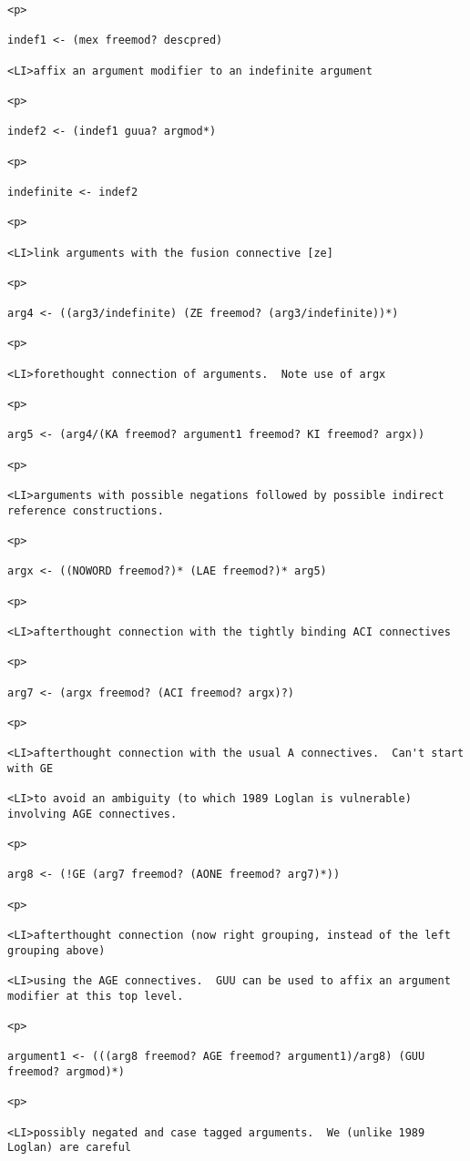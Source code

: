 \documentclass[12pt]{article}
\begin{document}
\begin{lstlisting}
<p>

indef1 <- (mex freemod? descpred)

<LI>affix an argument modifier to an indefinite argument

<p>

indef2 <- (indef1 guua? argmod*)

<p>

indefinite <- indef2

<p>

<LI>link arguments with the fusion connective [ze]

<p>

arg4 <- ((arg3/indefinite) (ZE freemod? (arg3/indefinite))*)

<p>

<LI>forethought connection of arguments.  Note use of argx

<p>

arg5 <- (arg4/(KA freemod? argument1 freemod? KI freemod? argx))

<p>

<LI>arguments with possible negations followed by possible indirect reference constructions.

<p>

argx <- ((NOWORD freemod?)* (LAE freemod?)* arg5)

<p>

<LI>afterthought connection with the tightly binding ACI connectives

<p>

arg7 <- (argx freemod? (ACI freemod? argx)?)

<p>

<LI>afterthought connection with the usual A connectives.  Can't start with GE

<LI>to avoid an ambiguity (to which 1989 Loglan is vulnerable) involving AGE connectives.

<p>

arg8 <- (!GE (arg7 freemod? (AONE freemod? arg7)*))

<p>

<LI>afterthought connection (now right grouping, instead of the left grouping above)

<LI>using the AGE connectives.  GUU can be used to affix an argument modifier at this top level.

<p>

argument1 <- (((arg8 freemod? AGE freemod? argument1)/arg8) (GUU freemod? argmod)*)

<p>

<LI>possibly negated and case tagged arguments.  We (unlike 1989 Loglan) are careful


\end{lstlisting}
\end{document}
